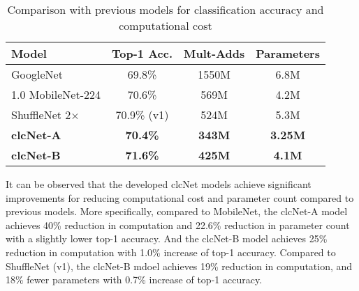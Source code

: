 \documentclass[10pt,twocolumn,letterpaper]{article}
\begin{document}
\begin{table}[h!]\small
\begin{center}
\begin{tabular}{l|c|c|c}
\hline
Model  & Top-1 Acc. & Mult-Adds & Parameters \\
\hline\hline
GoogleNet  & 69.8\%  & 1550M & 6.8M \\
1.0 MobileNet-224  & 70.6\%  & 569M & 4.2M \\
ShuffleNet 2$\times$  & 70.9\% (v1)  & 524M & 5.3M \\
\hline
\textbf{clcNet-A}  & \textbf{70.4\%}  & \textbf{343M} & \textbf{3.25M} \\
\textbf{clcNet-B}  & \textbf{71.6\%}  & \textbf{425M} & \textbf{4.1M} \\
\hline
\end{tabular}
\end{center}
\caption{Comparison with previous models for classification accuracy and computational cost}
\label{tb:exp_comp}
\end{table}

It can be observed that the developed clcNet models achieve significant improvements for reducing computational cost and parameter count compared to previous models. More specifically, 
compared to MobileNet, the clcNet-A model achieves 40\% reduction in computation and 22.6\% reduction in parameter count with a slightly lower top-1 accuracy. And the clcNet-B model achieves 25\% reduction in computation with 1.0\% increase of top-1 accuracy. Compared to ShuffleNet (v1\cite{shufflenet2017xiangyu}), the clcNet-B mdoel achieves 19\% reduction in computation, and 18\% fewer parameters with 0.7\% increase of top-1 accuracy.  

\end{document}
